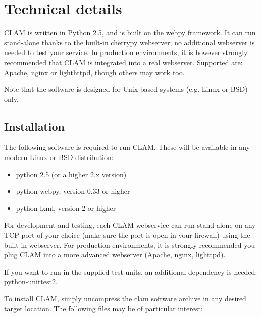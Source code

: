 \documentclass[a4paper,12pt]{report}
\begin{document}
\section{Technical details}

CLAM is written in Python 2.5, and is built on the webpy framework. It can run stand-alone thanks to the built-in cherrypy webserver; no additional webserver is needed to test your service. In production environments, it is however strongly recommended that CLAM is integrated into a real webserver. Supported are: Apache, nginx or lighthttpd, though others may work too.

 Note that the software is designed for Unix-based systems (e.g. Linux or BSD) only.

\subsection{Installation}

The following software is required to run CLAM. These will be available in any modern Linux or BSD distribution:

\begin{itemize}
\item python 2.5 (or a higher 2.x version)
\item python-webpy, version 0.33 or higher
\item python-lxml, version 2 or higher
\end{itemize}

For development and testing, each CLAM webservice can run stand-alone on any TCP port of your choice (make sure the port is open in your firewall) using the built-in webserver. For production environments, it is strongly recommended you plug CLAM into a more advanced webserver (Apache, nginx, lighttpd). 

If you want to run in the supplied test units, an additional dependency is needed: python-unittest2.

To install CLAM, simply uncompress the clam software archive in any desired target location. The following files may be of particular interest:
\end{document}
